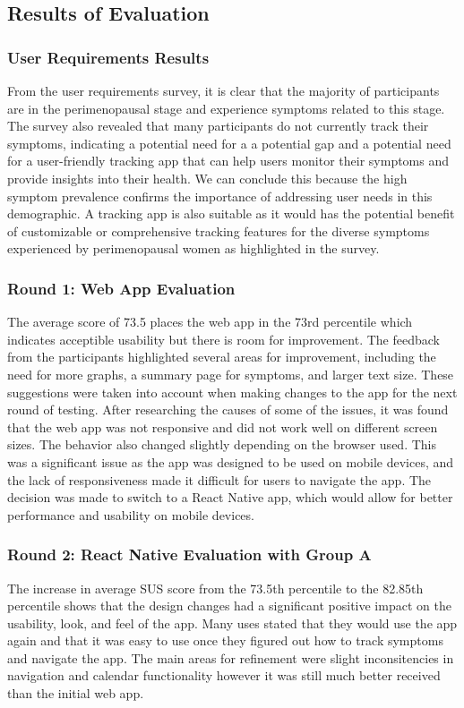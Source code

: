 \subsection{Results of Evaluation}

\subsubsection{User Requirements Results} 
From the user requirements survey, it is clear that the majority of participants are in the perimenopausal stage and experience symptoms related to this stage. The survey also revealed that many participants do not currently track their symptoms, indicating a potential need for a a potential gap and a potential need for a user-friendly tracking app that can help users monitor their symptoms and provide insights into their health. We can conclude this because the high symptom prevalence confirms the importance of addressing user needs in this demographic. A tracking app is also suitable as it would has the potential benefit of customizable or comprehensive tracking features for the diverse symptoms experienced by perimenopausal women as highlighted in the survey. 


\subsubsection{Round 1: Web App Evaluation}
The average score of 73.5 places the web app in the 73rd percentile which indicates acceptible usability but there is room for improvement. The feedback from the participants highlighted several areas for improvement, including the need for more graphs, a summary page for symptoms, and larger text size. These suggestions were taken into account when making changes to the app for the next round of testing. After researching the causes of some of the issues, it was found that the web app was not responsive and did not work well on different screen sizes. The behavior also changed slightly depending on the browser used. This was a significant issue as the app was designed to be used on mobile devices, and the lack of responsiveness made it difficult for users to navigate the app. The decision was made to switch to a React Native app, which would allow for better performance and usability on mobile devices.

\subsubsection{Round 2: React Native Evaluation with Group A}
The increase in average SUS score from the 73.5th percentile to the 82.85th percentile shows that the design changes had a significant positive impact on the usability, look, and feel of the app. Many uses stated that they would use the app again and that it was easy to use once they figured out how to track symptoms and navigate the app. The main areas for refinement were slight inconsitencies in navigation and calendar functionality however it was still much better received than the initial web app. 

